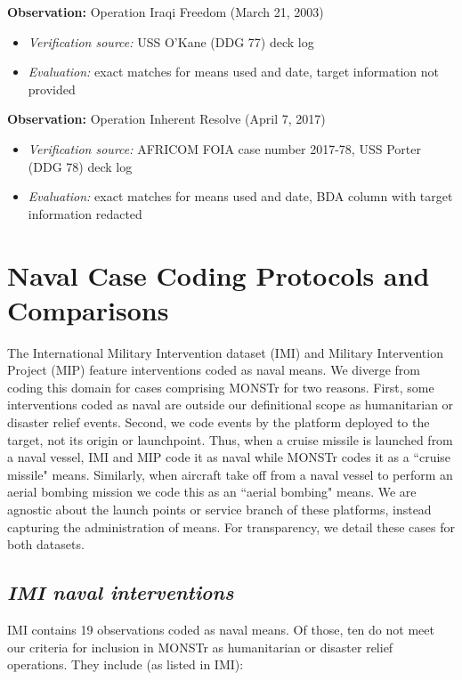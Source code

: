 \documentclass[fleqn,12pt]{article}
\begin{document}
\vspace{-.3cm}
\noindent
\textbf{Observation:} Operation Iraqi Freedom (March 21, 2003)
\begin{itemize}
    \item \textit{Verification source:} USS O'Kane (DDG 77) deck log
    \item \textit{Evaluation:} exact matches for means used and date, target information not provided
\end{itemize}

\vspace{-.3cm}
\noindent
\textbf{Observation:} Operation Inherent Resolve (April 7, 2017)
\begin{itemize}
    \item \textit{Verification source:} AFRICOM FOIA case number 2017-78, USS Porter (DDG 78) deck log
    \item \textit{Evaluation:} exact matches for means used and date, BDA column with target information redacted
\end{itemize}

\section{Naval Case Coding Protocols and Comparisons}
The International Military Intervention dataset (IMI) \citep{pearson_internationalmilitaryintervention_1993,kisangani_internationalmilitaryintervention_2008} and Military Intervention Project (MIP) \citep{kushi_introducingmilitaryintervention_2022} feature interventions coded as naval means. We diverge from coding this domain for cases comprising MONSTr for two reasons. First, some interventions coded as naval are outside our definitional scope as humanitarian or disaster relief events. Second, we code events by the platform deployed to the target, not its origin or launchpoint. Thus, when a cruise missile is launched from a naval vessel, IMI and MIP code it as naval while MONSTr codes it as a ``cruise missile" means. Similarly, when aircraft take off from a naval vessel to perform an aerial bombing mission we code this as an ``aerial bombing" means. We are agnostic about the launch points or service branch of these platforms, instead capturing the administration of means. For transparency, we detail these cases for both datasets.

\subsection*{\textit{IMI naval interventions}}
IMI contains 19 observations coded as naval means. Of those, ten do not meet our criteria for inclusion in MONSTr as humanitarian or disaster relief operations. They include (as listed in IMI): 
\end{document}
